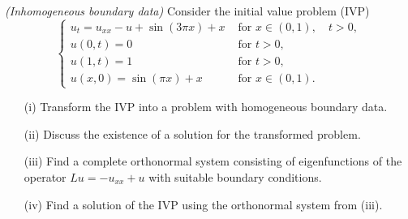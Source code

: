 
\begin{exercise}

\phantom{}
\textit{(Inhomogeneous boundary data)} Consider the initial value problem (IVP)
$$
\left\{\begin{array}{ll}
u_{t}=u_{x x}-u+\sin (3 \pi x)+x & \text { for } x \in(0,1), \quad t>0, \\
u(0, t)=0 & \text { for } t>0, \\
u(1, t)=1 & \text { for } t>0, \\
u(x, 0)=\sin (\pi x)+x & \text { for } x \in(0,1).
\end{array}\right.
$$
\begin{itemize}
\item[(i)] Transform the IVP into a problem with homogeneous boundary data.
\item[(ii)] Discuss the existence of a solution for the transformed problem.
\item[(iii)] Find a complete orthonormal system consisting of eigenfunctions of the operator $L u=-u_{x x}+u$ with suitable boundary conditions.
\item[(iv)] Find a solution of the IVP using the orthonormal system from (iii).
\end{itemize}

\end{exercise}


